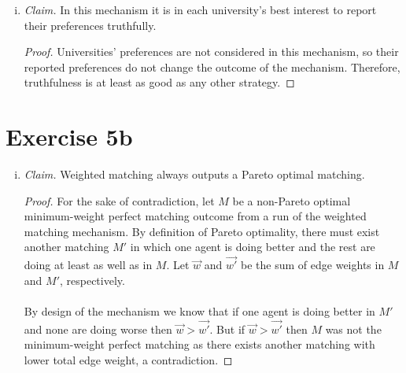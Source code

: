 \documentclass{article}
\begin{document}
\begin{enumerate}[i.]
\item
\textit{Claim.} In this mechanism it is in each university's best interest to report their preferences truthfully.
\begin{proof}
Universities' preferences are not considered in this mechanism, so their reported preferences do not change the outcome of the mechanism. Therefore, truthfulness is at least as good as any other strategy.
\end{proof}
\end{enumerate}

\section*{Exercise 5b}
\begin{enumerate}[i.]

\item %
\textit{Claim.} Weighted matching always outputs a Pareto optimal matching.
\begin{proof}
For the sake of contradiction, let $M$ be a non-Pareto optimal minimum-weight perfect matching outcome from a run of the weighted matching mechanism. By definition of Pareto optimality, there must exist another matching $M'$ in which one agent is doing better and the rest are doing at least as well as in $M$. Let $\vec{w}$ and $\vec{w'}$ be the sum of edge weights in $M$ and $M'$, respectively.\\
\\
By design of the mechanism we know that if one agent is doing better in $M'$ and none are doing worse then $\vec{w} > \vec{w'}$. But if $\vec{w} > \vec{w'}$ then $M$ was not the minimum-weight perfect matching as there exists another matching with lower total edge weight, a contradiction.
\end{proof}


\end{enumerate}
\end{document}
